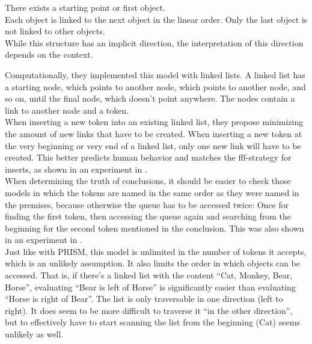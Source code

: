 \documentclass[hidelinks]{scrartcl}
\begin{document}
\begin{displayquote}
There exists a starting point or first object. \\
Each object is linked to the next object in the linear
order. Only the last object is not linked to other
objects. \\
While this structure has an implicit direction, the
interpretation of this direction depends on the
context.\\
\citep{Krumnack.2011}
\end{displayquote}

Computationally, they implemented this model with linked lists. A linked list has a starting node, which points to another node, which points to another node, and so on, until the final node, which doesn't point anywhere. The nodes contain a link to another node and a token. \\

When inserting a new token into an existing linked list, they propose minimizing the amount of new links that have to be created. When inserting a new token at the very beginning or very end of a linked list, only one new link will have to be created. This better predicts human behavior and matches the fff-strategy for inserts, as shown in an experiment in \cite{Krumnack.2011}. \\

When determining the truth of conclusions, it should be easier to check those models in which the tokens are named in the same order as they were named in the premises, because otherwise the queue has to be accessed twice: Once for finding the first token, then accessing the queue again and searching from the beginning for the second token mentioned in the conclusion. This was also shown in an experiment in \cite{Krumnack.2011}. \\

Just like with PRISM, this model is unlimited in the number of tokens it accepts, which is an unlikely assumption. It also limits the order in which objects can be accessed. That is, if there's a linked list with the content ``Cat, Monkey, Bear, Horse'', evaluating ``Bear is left of Horse'' is significantly easier than evaluating ``Horse is right of Bear''. The list is only traversable in one direction (left to right). It does seem to be more difficult to traverse it ``in the other direction'', but to effectively have to start scanning the list from the beginning (Cat) seems unlikely as well.
\end{document}
